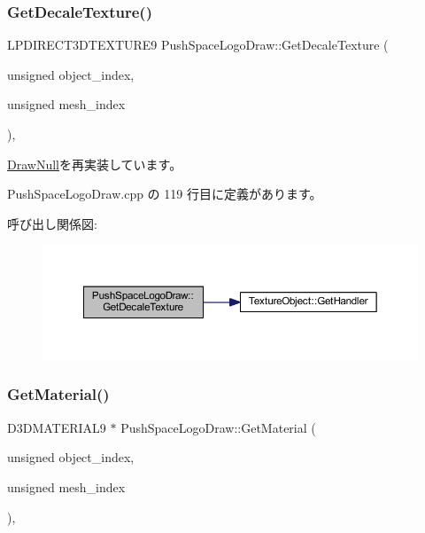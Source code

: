 \subsubsection{\texorpdfstring{Get\+Decale\+Texture()}{GetDecaleTexture()}}
{\footnotesize\ttfamily L\+P\+D\+I\+R\+E\+C\+T3\+D\+T\+E\+X\+T\+U\+R\+E9 Push\+Space\+Logo\+Draw\+::\+Get\+Decale\+Texture (\begin{DoxyParamCaption}\item[{unsigned}]{object\+\_\+index,  }\item[{unsigned}]{mesh\+\_\+index }\end{DoxyParamCaption})\hspace{0.3cm}{\ttfamily [override]}, {\ttfamily [virtual]}}



\mbox{\hyperlink{class_draw_null_a8496ed1b1f765a331a8f1704122b8ca4}{Draw\+Null}}を再実装しています。



 Push\+Space\+Logo\+Draw.\+cpp の 119 行目に定義があります。

呼び出し関係図\+:\nopagebreak
\begin{figure}[H]
\begin{center}
\leavevmode
\includegraphics[width=350pt]{class_push_space_logo_draw_a4990a9f5662af324f2632e8647cbdde4_cgraph}
\end{center}
\end{figure}
\mbox{\label{class_push_space_logo_draw_a0734eed4096afb12e6c9ef1f4d82b9d8}} 
\subsubsection{\texorpdfstring{Get\+Material()}{GetMaterial()}}
{\footnotesize\ttfamily D3\+D\+M\+A\+T\+E\+R\+I\+A\+L9 $\ast$ Push\+Space\+Logo\+Draw\+::\+Get\+Material (\begin{DoxyParamCaption}\item[{unsigned}]{object\+\_\+index,  }\item[{unsigned}]{mesh\+\_\+index }\end{DoxyParamCaption})\hspace{0.3cm}{\ttfamily [override]}, {\ttfamily [virtual]}}



